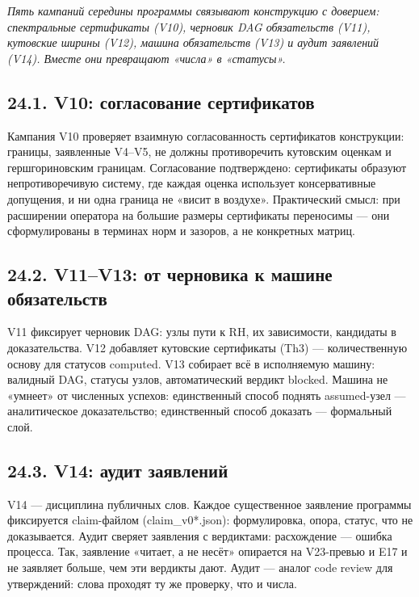 \documentclass[11pt,a4paper]{article}
\begin{document}
\noindent\textit{\color{copper}Пять кампаний середины программы связывают конструкцию с доверием: спектральные сертификаты (V10), черновик DAG обязательств (V11), кутовские ширины (V12), машина обязательств (V13) и аудит заявлений (V14). Вместе они превращают «числа» в «статусы».}

\subsection{24.1. V10: согласование сертификатов}

Кампания V10 проверяет взаимную согласованность сертификатов конструкции: границы, заявленные V4–V5, не должны противоречить кутовским оценкам и гершгориновским границам. Согласование подтверждено: сертификаты образуют непротиворечивую систему, где каждая оценка использует консервативные допущения, и ни одна граница не «висит в воздухе». Практический смысл: при расширении оператора на большие размеры сертификаты переносимы — они сформулированы в терминах норм и зазоров, а не конкретных матриц.

\subsection{24.2. V11–V13: от черновика к машине обязательств}

V11 фиксирует черновик DAG: узлы пути к RH, их зависимости, кандидаты в доказательства. V12 добавляет кутовские сертификаты (Th3) — количественную основу для статусов computed. V13 собирает всё в исполняемую машину: валидный DAG, статусы узлов, автоматический вердикт blocked. Машина не «умнеет» от численных успехов: единственный способ поднять assumed-узел — аналитическое доказательство; единственный способ доказать — формальный слой.

\subsection{24.3. V14: аудит заявлений}

V14 — дисциплина публичных слов. Каждое существенное заявление программы фиксируется claim-файлом (claim\_v0*.json): формулировка, опора, статус, что не доказывается. Аудит сверяет заявления с вердиктами: расхождение — ошибка процесса. Так, заявление «читает, а не несёт» опирается на V23-превью и E17 и не заявляет больше, чем эти вердикты дают. Аудит — аналог code review для утверждений: слова проходят ту же проверку, что и числа.
\end{document}
